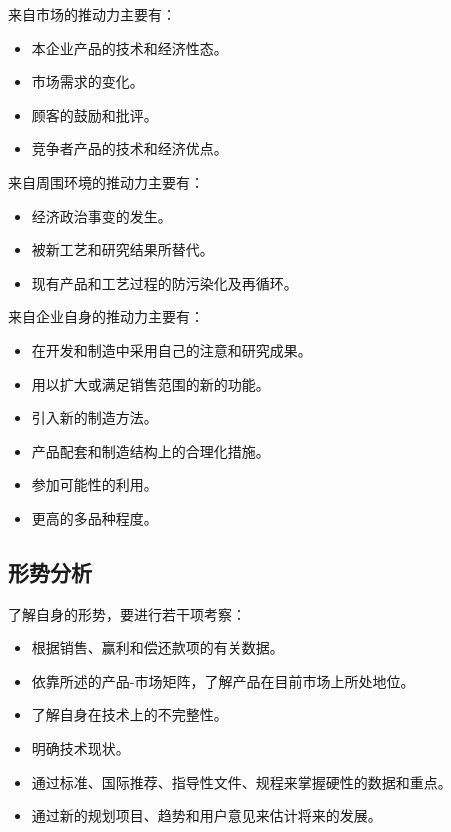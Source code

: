 \documentclass[letterpaper,10pt,english]{sphinxmanual}
\begin{document}
来自市场的推动力主要有：
\begin{itemize}
\item {} 
本企业产品的技术和经济性态。

\item {} 
市场需求的变化。

\item {} 
顾客的鼓励和批评。

\item {} 
竞争者产品的技术和经济优点。

\end{itemize}

来自周围环境的推动力主要有：
\begin{itemize}
\item {} 
经济政治事变的发生。

\item {} 
被新工艺和研究结果所替代。

\item {} 
现有产品和工艺过程的防污染化及再循环。

\end{itemize}

来自企业自身的推动力主要有：
\begin{itemize}
\item {} 
在开发和制造中采用自己的注意和研究成果。

\item {} 
用以扩大或满足销售范围的新的功能。

\item {} 
引入新的制造方法。

\item {} 
产品配套和制造结构上的合理化措施。

\item {} 
参加可能性的利用。

\item {} 
更高的多品种程度。

\end{itemize}


\subsection{形势分析}
\label{unit4:id4}
了解自身的形势，要进行若干项考察：
\begin{itemize}
\item {} 
根据销售、赢利和偿还款项的有关数据。

\item {} 
依靠所述的产品-市场矩阵，了解产品在目前市场上所处地位。

\item {} 
了解自身在技术上的不完整性。

\item {} 
明确技术现状。

\item {} 
通过标准、国际推荐、指导性文件、规程来掌握硬性的数据和重点。

\item {} 
通过新的规划项目、趋势和用户意见来估计将来的发展。

\end{itemize}
\end{document}
